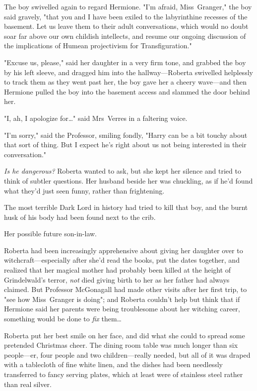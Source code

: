 The boy swivelled again to regard Hermione. "I'm afraid, Miss~Granger," the boy
said gravely, "that you and I have been exiled to the labyrinthine recesses of
the basement. Let us leave them to their adult conversations, which would no
doubt soar far above our own childish intellects, and resume our ongoing
discussion of the implications of Humean projectivism for Transfiguration."

"Excuse us, please," said her daughter in a very firm tone, and grabbed the boy
by his left sleeve, and dragged him into the hallway—Roberta swivelled
helplessly to track them as they went past her, the boy gave her a cheery
wave—and then Hermione pulled the boy into the basement access and slammed
the door behind her.

"I, ah, I apologize for…" said Mrs~Verres in a faltering voice.

"I'm sorry," said the Professor, smiling fondly, "Harry can be a bit touchy
about that sort of thing. But I expect he's right about us not being interested
in their conversation."

\emph{Is he dangerous?} Roberta wanted to ask, but she kept her silence and
tried to think of subtler questions. Her husband beside her was chuckling, as
if he'd found what they'd just seen funny, rather than frightening.

The most terrible Dark Lord in history had tried to kill that boy, and the
burnt husk of his body had been found next to the crib.

Her possible future son-in-law.

Roberta had been increasingly apprehensive about giving her daughter over to
witchcraft—especially after she'd read the books, put the dates together, and
realized that her magical mother had probably been killed at the height of
Grindelwald's terror, \emph{not} died giving birth to her as her father had
always claimed. But Professor McGonagall had made other visits after her first
trip, to "see how Miss~Granger is doing"; and Roberta couldn't help but think
that if Hermione said her parents were being troublesome about her witching
career, something would be done to \emph{fix} them…

Roberta put her best smile on her face, and did what she could to spread some
pretended Christmas cheer.
\later
The dining room table was much longer than six people—er, four people and two
children—really needed, but all of it was draped with a tablecloth of fine
white linen, and the dishes had been needlessly transferred to fancy serving
plates, which at least were of stainless steel rather than real silver.

